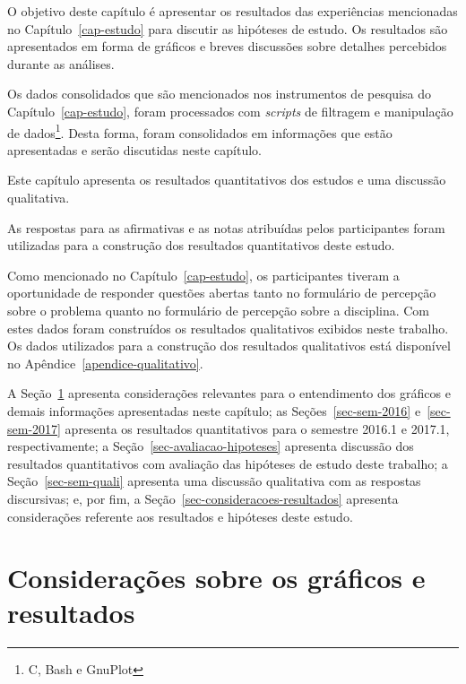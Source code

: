 

\label{cap-resultados}
\acresetall

O objetivo deste capítulo é apresentar os resultados das experiências
mencionadas no Capítulo~\ref{cap-estudo} para discutir as
hipóteses de estudo.
Os resultados são apresentados em forma de gráficos e
breves discussões sobre detalhes percebidos durante as análises.

Os dados consolidados que são mencionados nos instrumentos de pesquisa
do Capítulo~\ref{cap-estudo}, foram processados com
\textit{scripts} de filtragem e manipulação
de dados\footnote{C, Bash e GnuPlot}.
Desta forma,
foram consolidados em informações que estão
apresentadas e serão discutidas neste capítulo.

Este capítulo apresenta os resultados quantitativos
dos estudos e uma discussão qualitativa.

As respostas para as afirmativas e as notas atribuídas
pelos participantes foram utilizadas para a construção
dos resultados quantitativos deste estudo.

Como mencionado no Capítulo~\ref{cap-estudo}, os participantes
tiveram a oportunidade de responder questões abertas tanto no
formulário de percepção sobre o problema quanto no formulário
de percepção sobre a disciplina.
Com estes dados foram construídos os resultados qualitativos
exibidos neste trabalho.
Os dados utilizados para a construção dos resultados
qualitativos está disponível no Apêndice~\ref{apendice-qualitativo}.

A Seção~\ref{sec-ref-graficos} apresenta considerações relevantes para o
entendimento dos gráficos e demais informações apresentadas neste capítulo;
as Seções~\ref{sec-sem-2016} e~\ref{sec-sem-2017}
apresenta os resultados quantitativos para o semestre 2016.1 e 2017.1, respectivamente;
a Seção~\ref{sec-avaliacao-hipoteses} apresenta discussão dos resultados
quantitativos com avaliação das hipóteses de estudo deste trabalho;
a Seção~\ref{sec-sem-quali} apresenta uma discussão qualitativa com as respostas
discursivas;
e, por fim, a Seção~\ref{sec-consideracoes-resultados} apresenta
considerações referente aos resultados e hipóteses
deste estudo.

\section{Considerações sobre os gráficos e resultados}
\label{sec-ref-graficos}

